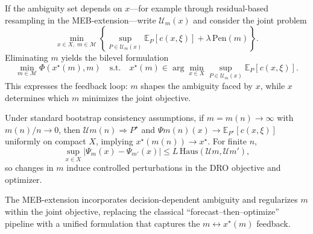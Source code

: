 \documentclass[review,a4paper,fleqn,3p,11pt,authoryear]{elsarticle}
\begin{document}
If the ambiguity set depends on $x$—for example through residual-based resampling in the MEB-extension—write $\mathcal{U}_m(x)$ and consider the joint problem
\begin{equation}
	\min_{x\in X,\; m\in\mathcal{M}}
	\left\{
	\sup_{P\in\mathcal{U}_m(x)} \mathbb{E}_P[c(x,\xi)]
	+ \lambda\,\mathrm{Pen}(m)
	\right\}.
\end{equation}
Eliminating $m$ yields the bilevel formulation
\begin{equation}
	\min_{m\in\mathcal{M}} 
	\Phi(x^\star(m),m)
	\quad\text{s.t.}\quad
	x^\star(m)\in\arg\min_{x\in X}
	\sup_{P\in\mathcal{U}_m(x)}\mathbb{E}_P[c(x,\xi)].
\end{equation}
This expresses the feedback loop: $m$ shapes the ambiguity faced by $x$, while $x$ determines which $m$ minimizes the joint objective.

Under standard bootstrap consistency assumptions, if $m=m(n)\to\infty$ with $m(n)/n\to 0$, then $\mathcal{U}{m(n)}\Rightarrow P^\star$ and $\Psi{m(n)}(x)\to\mathbb{E}_{P^\star}[c(x,\xi)]$ uniformly on compact $X$, implying $x^\star(m(n))\to x^\star$. For finite $n$,
\begin{equation}
	\sup_{x\in X}\big|\Psi_m(x)-\Psi_{m'}(x)\big|
	\le 
	L\,\mathrm{Haus}\!\left(\mathcal{U}m,\mathcal{U}{m'}\right),
\end{equation}
so changes in $m$ induce controlled perturbations in the DRO objective and optimizer.

The MEB-extension incorporates decision-dependent ambiguity and regularizes $m$ within the joint objective, replacing the classical ``forecast--then--optimize'' pipeline with a unified formulation that captures the $m\leftrightarrow x^\star(m)$ feedback.

%		
%		
%		
%		
%		
\end{document}
